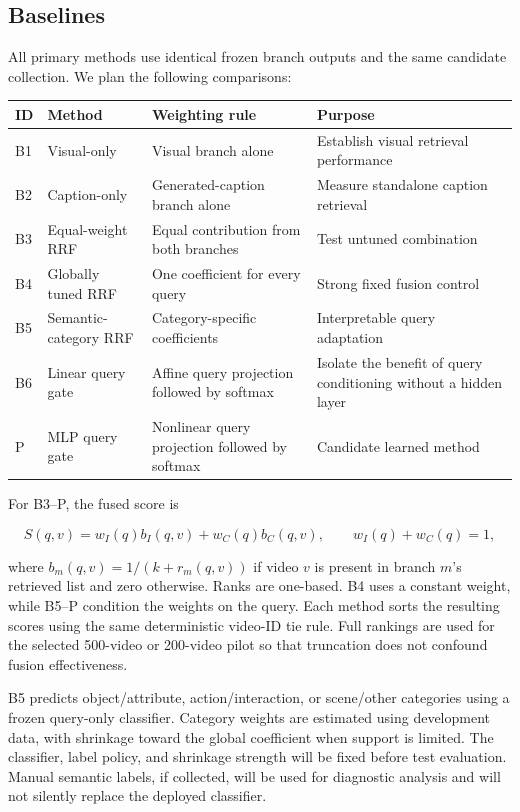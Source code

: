 \subsection{Baselines}

All primary methods use identical frozen branch outputs and the same candidate collection. We plan the following comparisons:

\begin{center}
\small
\begin{tabularx}{\textwidth}{@{}lXXX@{}}
\toprule
ID & Method & Weighting rule & Purpose \\
\midrule
B1 & Visual-only & Visual branch alone & Establish visual retrieval performance \\
B2 & Caption-only & Generated-caption branch alone & Measure standalone caption retrieval \\
B3 & Equal-weight RRF & Equal contribution from both branches & Test untuned combination \\
B4 & Globally tuned RRF & One coefficient for every query & Strong fixed fusion control \\
B5 & Semantic-category RRF & Category-specific coefficients & Interpretable query adaptation \\
B6 & Linear query gate & Affine query projection followed by softmax & Isolate the benefit of query conditioning without a hidden layer \\
P & MLP query gate & Nonlinear query projection followed by softmax & Candidate learned method \\
\bottomrule
\end{tabularx}
\end{center}

For B3--P, the fused score is

\[
S(q,v)=w_I(q)b_I(q,v)+w_C(q)b_C(q,v),\qquad w_I(q)+w_C(q)=1,
\]

where \(b_m(q,v)=1/(k+r_m(q,v))\) if video \(v\) is present in branch \(m\)'s retrieved list and zero otherwise. Ranks are one-based. B4 uses a constant weight, while B5--P condition the weights on the query. Each method sorts the resulting scores using the same deterministic video-ID tie rule. Full rankings are used for the selected 500-video or 200-video pilot so that truncation does not confound fusion effectiveness.

B5 predicts object/attribute, action/interaction, or scene/other categories using a frozen query-only classifier. Category weights are estimated using development data, with shrinkage toward the global coefficient when support is limited. The classifier, label policy, and shrinkage strength will be fixed before test evaluation. Manual semantic labels, if collected, will be used for diagnostic analysis and will not silently replace the deployed classifier.

